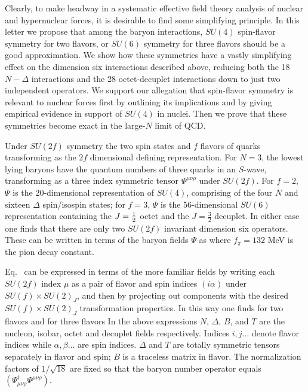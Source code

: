 Clearly, to make headway in a systematic effective field theory analysis of
nuclear and hypernuclear forces, it is desirable to find some simplifying
principle.  In this letter we propose that among the baryon interactions,
$SU(4)$ spin-flavor symmetry for two flavors, or $SU(6)$ symmetry for three
flavors should  be a good approximation.  We show how these symmetries have a
vastly simplifying effect on the dimension six interactions described above,
reducing both the 18 $N-\Delta$ interactions and the 28 octet-decuplet
interactions down to just two independent operators.  We support our allegation
that spin-flavor symmetry is relevant to nuclear forces first by outlining
its implications and by giving   empirical evidence in support of $SU(4)$ in
nuclei.  Then   we prove that these symmetries become exact in the large-$N$
limit of QCD.

Under $SU(2f)$ symmetry  the two spin states and $f$ flavors of quarks
transforming as the $2f$ dimensional defining representation.  For $N=3$, the
lowest lying
baryons have the quantum numbers  of three quarks in an $S$-wave, transforming
as a three index
symmetric tensor $\Psi^{\mu\nu\rho}$ under $SU(2f)$.  For $f=2$, $\Psi$ is the
20-dimensional representation of $SU(4)$, comprising of the four $N$ and
sixteen $\Delta$ spin/isospin states; for $f=3$, $\Psi$ is the 56-dimensional
$SU(6)$ representation    containing the $J={\textstyle{1\over2}}$ octet and the
$J=\frac{3}{2}$ decuplet.  In either case one finds that there are only two
$SU(2f)$ invariant dimension six operators.  These can be written in terms of
the baryon fields $\Psi$ as
\eqn{}
where $f_\pi=132$ MeV is the pion decay constant.

Eq. \suivop\  can be expressed in terms of the more familiar fields by writing
 each $SU(2f)$ index $\mu$  as a pair of  flavor and spin indices $(i\alpha)$
under $SU(f)\times SU(2)_J$, and then by projecting out components with the
desired $SU(f)\times SU(2)_J$ transformation properties.  In this way one finds
for two flavors
\eqn{}
and for three flavors
\eqn{}
In the above expressions $N$, $\Delta$, $B$, and $T$ are the nucleon, isobar,
octet and decuplet fields respectively.  Indices $i,j\ldots$ denote flavor
indices while $\alpha,\beta\ldots$ are spin indices. $\Delta$ and $T$ are
totally symmetric tensors separately in flavor and spin; $B$ is a traceless
matrix in flavor.  The normalization factors of $1/\sqrt{18}$ are fixed so that
the baryon number operator equals $(\Psi^{\dagger}_{\mu\nu\rho}
\Psi^{\mu\nu\rho})$.

